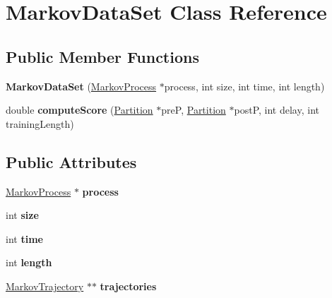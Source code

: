 \hypertarget{classMarkovDataSet}{\section{Markov\-Data\-Set Class Reference}
\label{classMarkovDataSet}
}
\subsection*{Public Member Functions}
\begin{DoxyCompactItemize}
\item 
\hypertarget{classMarkovDataSet_af5652def3bd861e32423628515212e1a}{{\bfseries Markov\-Data\-Set} (\hyperlink{classMarkovProcess}{Markov\-Process} $\ast$process, int size, int time, int length)}\label{classMarkovDataSet_af5652def3bd861e32423628515212e1a}

\item 
\hypertarget{classMarkovDataSet_a90e28188b58acc59d75d44e01022e180}{double {\bfseries compute\-Score} (\hyperlink{classPartition}{Partition} $\ast$pre\-P, \hyperlink{classPartition}{Partition} $\ast$post\-P, int delay, int training\-Length)}\label{classMarkovDataSet_a90e28188b58acc59d75d44e01022e180}

\end{DoxyCompactItemize}
\subsection*{Public Attributes}
\begin{DoxyCompactItemize}
\item 
\hypertarget{classMarkovDataSet_a4634e9ebbab3500e07fc039b7917c219}{\hyperlink{classMarkovProcess}{Markov\-Process} $\ast$ {\bfseries process}}\label{classMarkovDataSet_a4634e9ebbab3500e07fc039b7917c219}

\item 
\hypertarget{classMarkovDataSet_ad00c1b3025f6fcbd67e7c23b456962bd}{int {\bfseries size}}\label{classMarkovDataSet_ad00c1b3025f6fcbd67e7c23b456962bd}

\item 
\hypertarget{classMarkovDataSet_a5ac0cfb2d1cbe80c7f4e6c980c93dcdd}{int {\bfseries time}}\label{classMarkovDataSet_a5ac0cfb2d1cbe80c7f4e6c980c93dcdd}

\item 
\hypertarget{classMarkovDataSet_a4506dddc00f33e4e889a5de277bd2966}{int {\bfseries length}}\label{classMarkovDataSet_a4506dddc00f33e4e889a5de277bd2966}

\item 
\hypertarget{classMarkovDataSet_aee1a6c899637e2c9cc3c22977b17f7b2}{\hyperlink{classMarkovTrajectory}{Markov\-Trajectory} $\ast$$\ast$ {\bfseries trajectories}}\label{classMarkovDataSet_aee1a6c899637e2c9cc3c22977b17f7b2}

\end{DoxyCompactItemize}


